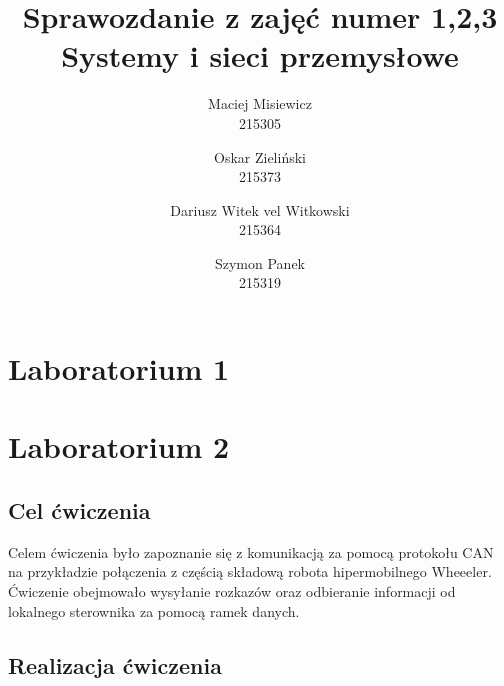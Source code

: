 \documentclass[margin = 2cm]{article}
\begin{document}
\title{\textbf{Sprawozdanie z zajęć numer 1,2,3 \\Systemy i sieci przemysłowe}} %
\author{Maciej Misiewicz\\215305 \and Oskar Zieliński\\215373 \and Dariusz Witek vel Witkowski\\215364 \and Szymon Panek\\215319}

\maketitle


\newpage
\tableofcontents
\newpage

\section{Laboratorium 1}
\section{Laboratorium 2}
	\subsection{Cel ćwiczenia}
	Celem ćwiczenia było zapoznanie się z komunikacją za pomocą protokołu CAN na przykładzie połączenia z częścią składową robota hipermobilnego Wheeeler. Ćwiczenie obejmowało wysyłanie rozkazów oraz odbieranie informacji od lokalnego sterownika za pomocą ramek danych.
	\subsection{Realizacja ćwiczenia}
\end{document}
